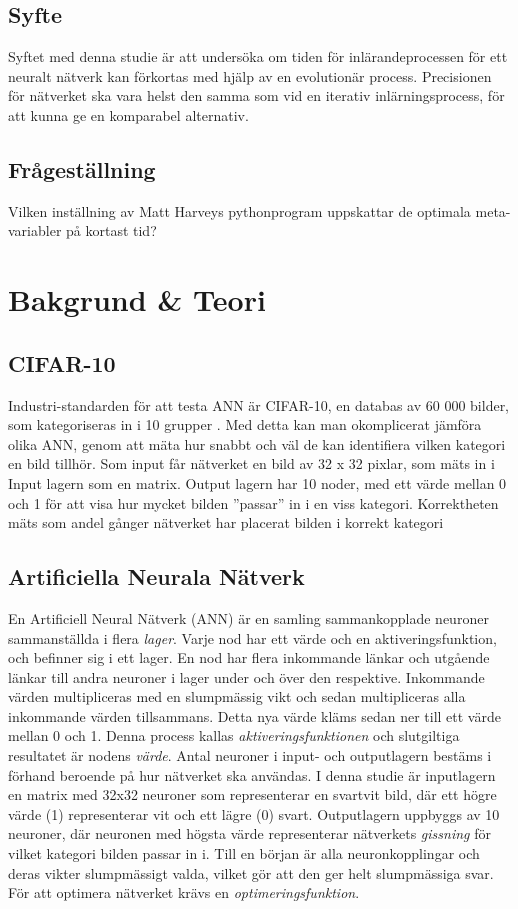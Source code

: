 \documentclass[a4paper, 12pt]{article}
\begin{document}
    \subsection{Syfte}
    Syftet med denna studie är att undersöka om tiden för inlärandeprocessen för ett neuralt nätverk kan förkortas med hjälp av en evolutionär process. Precisionen för nätverket ska vara helst den samma som vid en iterativ inlärningsprocess, för att kunna ge en komparabel alternativ.
    \subsection{Frågeställning}
    Vilken inställning av Matt Harveys pythonprogram uppskattar de optimala meta-variabler på kortast tid?

  \section{Bakgrund \& Teori}
    \subsection{CIFAR-10}
    Industri-standarden för att testa ANN är CIFAR-10, en databas av 60 000 bilder, som kategoriseras in i 10 grupper \parencite{krizhevsky2014cifar}. Med detta kan man okomplicerat jämföra olika ANN, genom att mäta hur snabbt och väl de kan identifiera vilken kategori en bild tillhör. Som input får nätverket en bild av 32 x 32 pixlar, som mäts in i Input lagern som en matrix. Output lagern har 10 noder, med ett värde mellan 0 och 1 för att visa hur mycket bilden ”passar” in i en viss kategori. Korrektheten mäts som andel gånger nätverket har placerat bilden i korrekt kategori

    \subsection{Artificiella Neurala Nätverk}
    En Artificiell Neural Nätverk (ANN) är en samling sammankopplade neuroner sammanställda i flera \textit{lager}. Varje nod har ett värde och en aktiveringsfunktion, och befinner sig i ett lager. En nod har flera inkommande länkar och utgående länkar till andra neuroner i lager under och över den respektive. Inkommande värden multipliceras med en slumpmässig vikt och sedan multipliceras alla inkommande värden tillsammans. Detta nya värde kläms sedan ner till ett värde mellan 0 och 1. Denna process kallas \textit{aktiveringsfunktionen} och slutgiltiga resultatet är nodens \textit{värde}. Antal neuroner i input- och outputlagern bestäms i förhand beroende på hur nätverket ska användas. I denna studie är inputlagern en matrix med 32x32 neuroner som representerar en svartvit bild, där ett högre värde (1) representerar vit och ett lägre (0) svart. Outputlagern uppbyggs av 10 neuroner, där neuronen med högsta värde representerar nätverkets \textit{gissning} för vilket kategori bilden passar in i. Till en början är alla neuronkopplingar och deras vikter slumpmässigt valda, vilket gör att den ger helt slumpmässiga svar. För att optimera nätverket krävs en \textit{optimeringsfunktion}.
\end{document}
